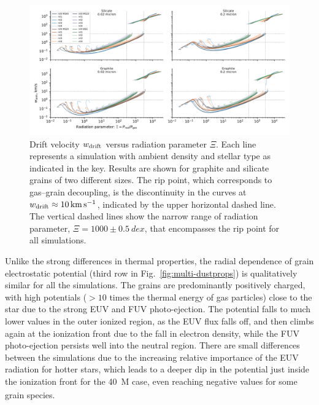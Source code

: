  
\begin{figure}
  \includegraphics[width=\linewidth]{figs/drift-pratio-4panel}
  \caption{Drift velocity \(w_{\text{drift}}\) versus radiation parameter
    \(\Xi\). Each line represents a simulation with ambient density and
    stellar type as indicated in the key.  Results are shown for
    graphite and silicate grains of two different sizes.  The rip
    point, which corresponds to gas--grain decoupling, is the
    discontinuity in the curves at
    \(w_{\text{drift}} \approx \SI{10}{km.s^{-1}}\), indicated by the upper
    horizontal dashed line.  The vertical dashed lines show the narrow
    range of radiation parameter, \(\Xi = 1000 \pm \SI{0.5}{dex}\), that
    encompasses the rip point for all simulations. }
  \label{fig:drift-gn}
\end{figure}

Unlike the strong differences in thermal properties, the radial
dependence of grain electrostatic potential (third row in
Fig.~\ref{fig:multi-dustprops}) is qualitatively similar for all the
simulations.  The grains are predominantly positively charged, with high
potentials (\(> 10\) times the thermal energy of gas particles) close
to the star due to the strong EUV and FUV photo-ejection.  The
potential falls to much lower values in the outer ionized region, as
the EUV flux falls off, and then climbs again at the ionization front
due to the fall in electron density, while the FUV photo-ejection
persists well into the neutral region.  There are small differences
between the simulations due to the increasing relative importance of the
EUV radiation for hotter stars, which leads to a deeper dip in the
potential just inside the ionization front for the \SI{40}{M_\odot} case,
even reaching negative values for some grain species.

